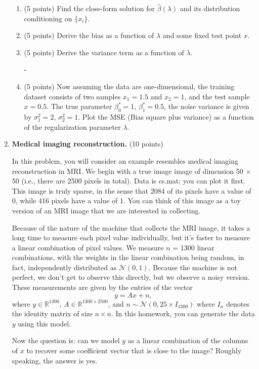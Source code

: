 \documentclass[twoside,10pt]{article}
\begin{document}
\begin{enumerate}
\begin{enumerate}
\item (5 points) Find the close-form solution for $\widehat {\beta}(\lambda)$ and its distribution conditioning on $\{x_i\}$.

\item (5 points) Derive the bias as a function of $\lambda$ and some fixed test point $x$.

\item (5 points) Derive the variance term as a function of $\lambda$.

	⁃	\item (5 points) Now assuming the data are one-dimensional, the training dataset consists of two samples $x_1 = 1.5$ and $x_2 = 1$,  and the test sample $x = 0.5$. The true parameter $\beta_0^* = 1$, $\beta_1^* = 0.5$, the noise variance is given by $\sigma_1^2 = 2$, $\sigma_2^2 = 1$. Plot the MSE (Bias square plus variance) as a function of the regularization parameter $\lambda$. 

\end{enumerate} 


\clearpage
\item {\bf Medical imaging reconstruction.} (10 points)

In this problem, you will consider an example resembles medical imaging reconstruction in MRI.  We begin with a true image image of dimension 50 $\times$ 50 (i.e., there are 2500 pixels in total). Data is \textsf{cs.mat}; you can plot it first. This image is truly sparse, in the sense that 2084 of its pixels have a value of 0, while 416 pixels have a value of 1. You can think of this image as a toy version of an MRI image that we are interested in collecting.

Because of the nature of the machine that collects the MRI image, it takes a long time to measure each pixel value individually, but it's faster to measure a linear combination of pixel values. We measure $n$ = 1300 linear combinations, with the weights in the linear combination being random, in fact, independently distributed as $\mathcal{N}(0,1)$. Because the machine is not perfect, we don't get to observe this directly, but we observe a noisy version. These measurements are given by the entries of the vector
\[
y = A x + n,
\]
where $y \in \mathbb R^{1300}$, $A \in \mathbb R^{1300\times 2500}$, and $n \sim \mathcal N(0, 25\times I_{1300})$ where $I_n$ denotes the identity matrix of size $n\times n$. In this homework, you can generate the data $y$ using this model. 

Now the question is: can we model $y$ as a linear combination of the columns of $x$ to recover some coefficient vector that is close to the image? Roughly speaking, the answer is yes. 


\end{enumerate}
\end{document}
